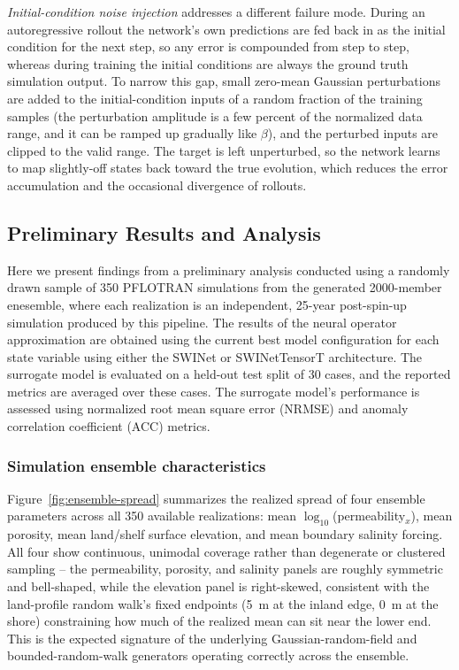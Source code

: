 \emph{Initial-condition noise injection} addresses a different failure mode. During an autoregressive rollout the network's own predictions are fed back in as the initial condition for the next step, so any error is compounded from step to step, whereas during training the initial conditions are always the ground truth simulation output.
To narrow this gap, small zero-mean Gaussian perturbations are added to the initial-condition inputs of a random fraction of the training samples (the perturbation amplitude is a few percent of the normalized data range, and it
can be ramped up gradually like $\beta$), and the perturbed inputs are clipped to the valid range. The target is left unperturbed, so the network learns to map slightly-off states back toward the true evolution, which reduces the
error accumulation and the occasional divergence of rollouts.

\subsection{Preliminary Results and Analysis}
\label{sec:findings}

Here we present findings from a preliminary analysis conducted using a randomly drawn sample of 350 PFLOTRAN simulations from the generated 2000-member enesemble, where each realization is an independent, 25-year post-spin-up simulation produced by this pipeline. The results of the neural operator approximation are obtained using the current best model configuration for each state variable using either the SWINet or SWINetTensorT architecture. The surrogate model is evaluated on a held-out test split of 30 cases, and the reported metrics are averaged over these cases. The surrogate model's performance is assessed using normalized root mean square error (NRMSE) and anomaly correlation coefficient (ACC) metrics.


\subsubsection{Simulation ensemble characteristics}

Figure~\ref{fig:ensemble-spread} summarizes the realized spread of four
ensemble parameters across all 350 available realizations: mean
$\log_{10}$(permeability$_x$), mean porosity, mean land/shelf surface
elevation, and mean boundary salinity forcing. All four show continuous,
unimodal coverage rather than degenerate or clustered sampling -- the
permeability, porosity, and salinity panels are roughly symmetric and
bell-shaped, while the elevation panel is right-skewed, consistent with the
land-profile random walk's fixed endpoints (5~m at the inland edge, 0~m at
the shore) constraining how much of the realized mean can sit near the
lower end. This is the expected signature of the underlying
Gaussian-random-field and bounded-random-walk generators operating
correctly across the ensemble.

